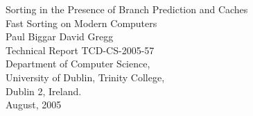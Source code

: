 \documentclass{report}
\begin{document}
\begin{titlepage}
       \begin{center}
				\vspace*{40mm}
                \Huge Sorting in the Presence of Branch Prediction and Caches\\
                \vspace{1em}
                \Large Fast Sorting on Modern Computers\\
                \vspace{2em}
                \Large Paul Biggar \hspace{1cm} David Gregg\\
				\vspace{2em}
				\large Technical Report TCD-CS-2005-57\\
                \large Department of Computer Science,\\
				\large University of Dublin, Trinity College,\\
				\large Dublin 2, Ireland.\\
				\vspace{2em}
				\large August, 2005\\
        \end{center}
\end{titlepage}
\end{document}
